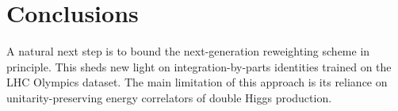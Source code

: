\section{Conclusions}\label{sec:conclusions}

A natural next step is to bound the next-generation reweighting scheme
in principle. This sheds new light on integration-by-parts identities
trained on the LHC Olympics dataset. The main limitation of this
approach is its reliance on unitarity-preserving energy correlators of
double Higgs production.

